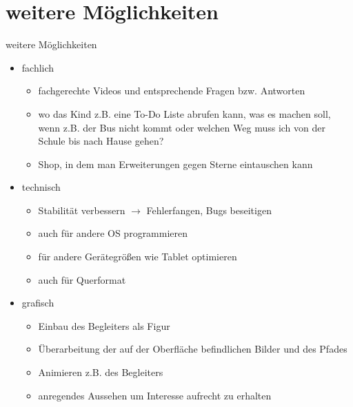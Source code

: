 \documentclass[10pt,fleqn]{beamer}
\begin{document}
\section{weitere Möglichkeiten}
\begin{frame}[t]{weitere Möglichkeiten}
	\begin{itemize}
		\item fachlich
		\begin{itemize}
			\item fachgerechte Videos und entsprechende Fragen bzw. Antworten
			\item wo das Kind z.B. eine To-Do Liste abrufen kann, was es machen soll,
			wenn z.B. der Bus nicht kommt oder welchen Weg muss ich von der Schule bis nach
			Hause gehen?
			\item Shop, in dem man Erweiterungen gegen Sterne eintauschen kann
		\end{itemize}
		\item technisch
		\begin{itemize}
			\item Stabilität verbessern $\rightarrow$ Fehlerfangen, Bugs beseitigen
			\item auch für andere OS programmieren
			\item für andere Gerätegrößen wie Tablet optimieren
			\item auch für Querformat
		\end{itemize}
		\item grafisch
		\begin{itemize}
			\item Einbau des Begleiters als Figur
			\item Überarbeitung der auf der Oberfläche befindlichen Bilder und des Pfades
			\item Animieren z.B. des Begleiters
			\item anregendes Aussehen um Interesse aufrecht zu erhalten
		\end{itemize}
	\end{itemize}
\end{frame}
\end{document}
